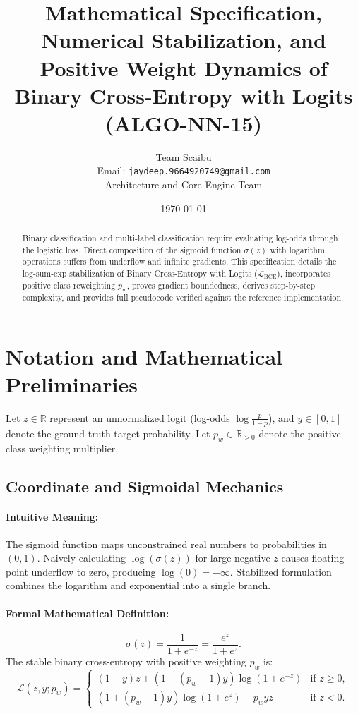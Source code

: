 \documentclass[11pt]{article}
\title{\textbf{Mathematical Specification, Numerical Stabilization, and Positive Weight Dynamics of Binary Cross-Entropy with Logits (ALGO-NN-15)}}
\author{Team Scaibu \\ \small Email: \texttt{jaydeep.9664920749@gmail.com} \\ \small Architecture and Core Engine Team}
\date{\today}
\begin{document}
\maketitle

\begin{abstract}
Binary classification and multi-label classification require evaluating log-odds through the logistic loss. Direct composition of the sigmoid function $\sigma(z)$ with logarithm operations suffers from underflow and infinite gradients. This specification details the log-sum-exp stabilization of Binary Cross-Entropy with Logits ($\mathcal{L}_{\mathrm{BCE}}$), incorporates positive class reweighting $p_w$, proves gradient boundedness, derives step-by-step complexity, and provides full pseudocode verified against the reference implementation.
\end{abstract}

\section{Notation and Mathematical Preliminaries}
\label{sec:notation}

Let $z \in \mathbb{R}$ represent an unnormalized logit (log-odds $\log\frac{p}{1-p}$), and $y \in [0, 1]$ denote the ground-truth target probability. Let $p_w \in \mathbb{R}_{>0}$ denote the positive class weighting multiplier.

\subsection{Coordinate and Sigmoidal Mechanics}
\paragraph{Intuitive Meaning:} The sigmoid function maps unconstrained real numbers to probabilities in $(0, 1)$. Naively calculating $\log(\sigma(z))$ for large negative $z$ causes floating-point underflow to zero, producing $\log(0) = -\infty$. Stabilized formulation combines the logarithm and exponential into a single branch.

\paragraph{Formal Mathematical Definition:}
\begin{equation}
\sigma(z) = \frac{1}{1 + e^{-z}} = \frac{e^z}{1 + e^z}.
\end{equation}
The stable binary cross-entropy with positive weighting $p_w$ is:
\begin{equation}
\label{eq:bce_stable}
\mathcal{L}(z, y; p_w) = \begin{cases}
(1 - y) z + (1 + (p_w - 1)y) \log(1 + e^{-z}) & \text{if } z \ge 0, \\
(1 + (p_w - 1)y) \log(1 + e^z) - p_w y z & \text{if } z < 0.
\end{cases}
\end{equation}
\end{document}
